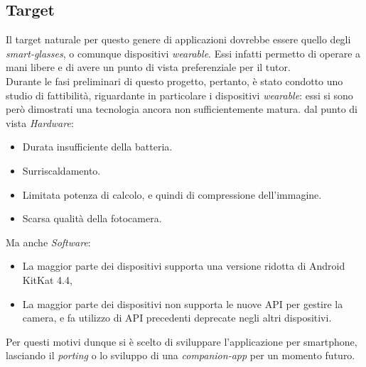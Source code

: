 \documentclass[conference]{IEEEtran}
\begin{document}
	\subsection{Target}
		Il target naturale per questo genere di applicazioni dovrebbe essere quello degli
		\textit{smart-glasses}, o comunque dispositivi \textit{wearable}. Essi infatti
		permetto di operare a mani libere e di avere un punto di vista preferenziale per
		il tutor.\\
		Durante le fasi preliminari di questo progetto, pertanto, è stato condotto uno studio
		di fattibilità, riguardante in particolare i dispositivi \textit{wearable}: essi si sono 
		però dimostrati una tecnologia ancora non sufficientemente matura. dal punto di vista
		\textit{Hardware}:
		\begin{itemize}
			\item Durata insufficiente della batteria.
			\item Surriscaldamento.
			\item Limitata potenza di calcolo, e quindi di compressione dell'immagine.
			\item Scarsa qualità della fotocamera.
		\end{itemize}
		Ma anche \textit{Software}:
		\begin{itemize}
			\item La maggior parte dei dispositivi supporta una versione ridotta di Android KitKat 4.4,
			\item La maggior parte dei dispositivi non supporta le nuove API per gestire la camera, e 
			fa utilizzo di API precedenti deprecate negli altri dispositivi.
		\end{itemize}
		Per questi motivi dunque si è scelto di sviluppare l'applicazione per smartphone, lasciando
		il \textit{porting} o lo sviluppo di una \textit{companion-app} per un momento futuro.
\end{document}
